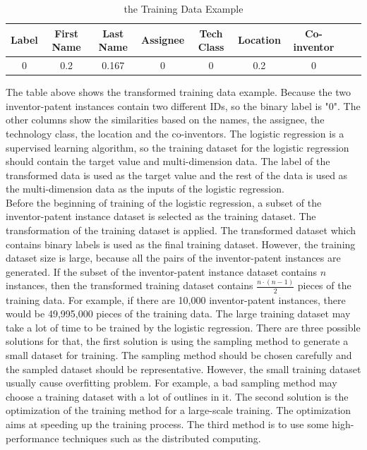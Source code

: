 \begin{table}[htb]
\scriptsize
\begin{center}
\begin{tabular}{ | c | c | c | c | c | c | c | c | c |}
\hline
  Label  & First Name & Last Name & Assignee & Tech Class & Location & Co-inventor \\ \hline
   0 &0.2 & 0.167 & 0 &  0 & 0.2 & 0 \\ 
   \hline
\end{tabular}
\end{center} 
\caption{the Training Data Example}
\end{table}
The table above shows the transformed training data example. Because the two inventor-patent instances contain two different IDs, so the binary label is "0". The other columns show the similarities based on the names, the assignee, the technology class, the location and the co-inventors. The logistic regression is a supervised learning algorithm, so the training dataset for the logistic regression should contain the target value and multi-dimension data. The label of the transformed data is used as the target value and the rest of the data is used as the multi-dimension data as the inputs of the logistic regression. \\
Before the beginning of  training of the logistic regression, a subset of the inventor-patent instance dataset is selected as the training dataset. The transformation of the training dataset is applied. The transformed dataset which contains binary labels is used as the final training dataset. However, the training dataset size is large, because all the pairs of the inventor-patent instances are generated. If the subset of the inventor-patent instance dataset contains $n$ instances, then the transformed training dataset contains $\frac{n \cdot (n-1)}{2} $ pieces of the training data. For example, if there are 10,000 inventor-patent instances, there would be 49,995,000 pieces of the training data. The large training dataset may take a lot of time to be trained by the logistic regression. There are three possible solutions for that, the first solution is using the sampling method to generate a small dataset for training. The sampling method should be chosen carefully and the sampled dataset should be representative. However, the small training dataset usually cause overfitting problem. For example, a bad sampling method may choose a training dataset with a lot of outlines in it. The second solution is the optimization of the training method for a large-scale training. The optimization aims at speeding up the training process. The third method is to use some high-performance techniques  such as the distributed computing. 

